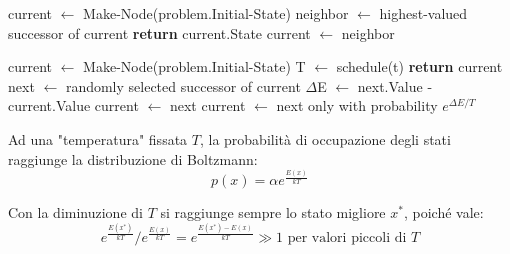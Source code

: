 \begin{algorithm}[h]
    \caption{Hill-Climbing(problem) \textbf{returns} state that is a local maximum}
    \begin{algorithmic}[i]
        \State current $\gets$ Make-Node(problem.Initial-State)
        \Loop
            \State neighbor $\gets$ highest-valued successor of current
                \State \textbf{return} current.State
            \EndIf
            \State current $\gets$ neighbor
        \EndLoop
    \end{algorithmic}
\end{algorithm}

\begin{algorithm}[h]
    \caption{Simulated-Annealing(problem, schefule) \textbf{returns} solution state}
    \begin{algorithmic}[i]
        \State current $\gets$ Make-Node(problem.Initial-State)
            \State T $\gets$ schedule(t)
             \textbf{return} current
            \EndIf
            \State next $\gets$ randomly selected successor of current
            \State $\Delta$E $\gets$ next.Value - current.Value
             current $\gets$ next
            \Else current $\gets$ next only with probability $e^{\Delta E/T}$
            \EndIf
        \EndFor
    \end{algorithmic}
\end{algorithm}

\noindent Ad una "temperatura" fissata $T$, la probabilità di occupazione degli stati raggiunge la distribuzione di Boltzmann: \[
    p(x) = \alpha e^{\frac{E(x)}{kT}}
\]

\noindent Con la diminuzione di $T$ si raggiunge sempre lo stato migliore $x^*$, poiché vale: \[
    e^{\frac{E(x^*)}{kT}} / e^{\frac{E(x)}{kT}} = e^{\frac{E(x^*)-E(x)}{kT}} \gg 1 \text{ per valori piccoli di } T
\]

